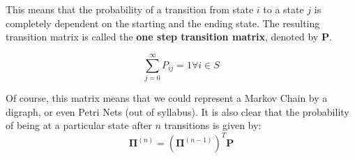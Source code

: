 \documentclass[12pt,letterpaper]{amsbook}
\theoremstyle{definition}
\begin{document}
This means that the probability of a transition from state $i$ to a state $j$ is completely dependent on the starting and the ending state. The resulting transition matrix is called the \textbf{one step transition matrix}, denoted by $\textbf{P}$.

\begin{lemma}
  \[\sum_{j = 0}^{\infty} P_{ij} = 1 \forall i \in S\]
\end{lemma}

Of course, this matrix means that we could represent a Markov Chain by a digraph, or even Petri Nets (out of syllabus). It is also clear that the probability of being at a particular state after $n$ transitions is given by:
\[ \mathbf{\Pi}^{(n)} = (\mathbf{\Pi}^{(n-1)})^T \textbf{P} \]
\end{document}
